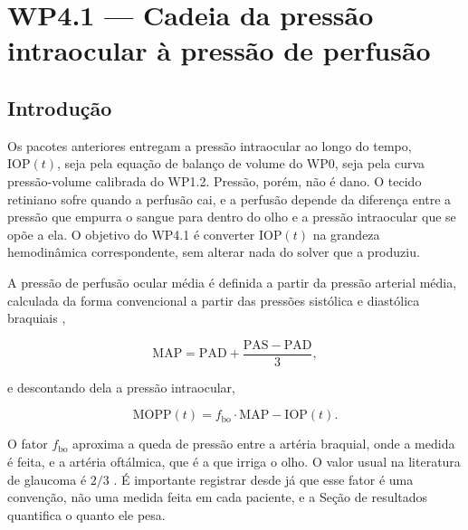 %
%

\section{WP4.1 --- Cadeia da pressão intraocular à pressão de perfusão}

\subsection{Introdução}

Os pacotes anteriores entregam a pressão intraocular ao longo do tempo, $\mathrm{IOP}(t)$, seja pela equação de balanço de volume do WP0, seja pela curva pressão-volume calibrada do WP1.2. Pressão, porém, não é dano. O tecido retiniano sofre quando a perfusão cai, e a perfusão depende da diferença entre a pressão que empurra o sangue para dentro do olho e a pressão intraocular que se opõe a ela. O objetivo do WP4.1 é converter $\mathrm{IOP}(t)$ na grandeza hemodinâmica correspondente, sem alterar nada do solver que a produziu.

A pressão de perfusão ocular média é definida a partir da pressão arterial média, calculada da forma convencional a partir das pressões sistólica e diastólica braquiais \citep{sehi2010},

\begin{equation}
\mathrm{MAP}=\mathrm{PAD}+\frac{\mathrm{PAS}-\mathrm{PAD}}{3},
\label{eq:map}
\end{equation}

e descontando dela a pressão intraocular,

\begin{equation}
\mathrm{MOPP}(t)=f_{\mathrm{bo}}\cdot\mathrm{MAP}-\mathrm{IOP}(t).
\label{eq:mopp}
\end{equation}

O fator $f_{\mathrm{bo}}$ aproxima a queda de pressão entre a artéria braquial, onde a medida é feita, e a artéria oftálmica, que é a que irriga o olho. O valor usual na literatura de glaucoma é $2/3$ \citep{leske2009}. É importante registrar desde já que esse fator é uma convenção, não uma medida feita em cada paciente, e a Seção de resultados quantifica o quanto ele pesa.

